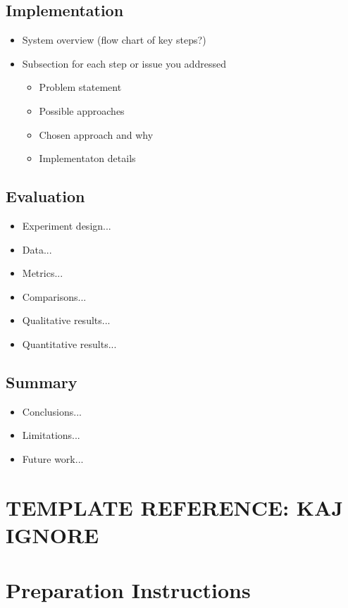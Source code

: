 \documentclass[pageno]{jpaper}
\begin{document}
\subsection{Implementation}
\begin{itemize}
	\item System overview (flow chart of key steps?)
	\item Subsection for each step or issue you addressed
	\begin{itemize}
		\item Problem statement
		\item Possible approaches
		\item Chosen approach and why
		\item Implementaton details
	\end{itemize}
\end{itemize}

\subsection{Evaluation}
\begin{itemize}
	\item Experiment design...
	\item Data...
	\item Metrics...
	\item Comparisons...
	\item Qualitative results...
	\item Quantitative results...
\end{itemize}

\subsection{Summary}
\begin{itemize}
	\item Conclusions...
	\item Limitations...
	\item Future work...
\end{itemize}








\section{TEMPLATE REFERENCE: KAJ IGNORE}
\section{Preparation Instructions}
\end{document}
